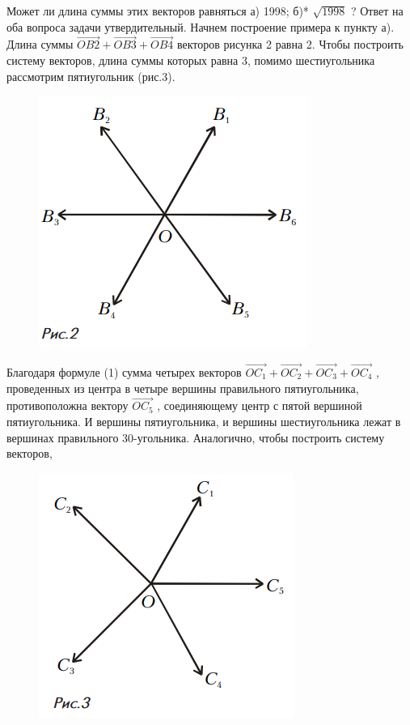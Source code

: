 \documentclass[9pt]{article}
\begin{document}
\begin{multicols}{2}

Может ли длина суммы этих векторов равняться а) 1998; б)* $\sqrt{1998}$ ?
Ответ на оба вопроса задачи утвердительный. Начнем
построение примера к пункту а). Длина суммы $\vec{OB2} + \vec{OB3} + \vec{OB4}$
 векторов рисунка 2 равна 2. Чтобы построить систему векторов, длина суммы которых равна 3,
помимо шестиугольника рассмотрим пятиугольник (рис.3).

\begin{figure}
  \begin{left}
    \includegraphics[scale = 0.65]{r2.png}
  \end{left}
\end{figure}

Благодаря формуле (1)
сумма четырех векторов $\vec{OC_1} + \vec{OC_2} + \vec{OC_3}  + \vec{OC_4}$
, проведенных из центра в четыре вершины правильного пятиугольника,
противоположна вектору $\vec{OC_5}$
, соединяющему центр с пятой вершиной пятиугольника.
И вершины пятиугольника, и вершины шестиугольника лежат в вершинах
правильного 30-угольника.
Аналогично, чтобы построить систему векторов,

\begin{figure}
  \begin{left}
    \includegraphics[scale = 0.65]{r3.png}
  \end{left}
\end{figure}


\end{multicols}
\end{document}
